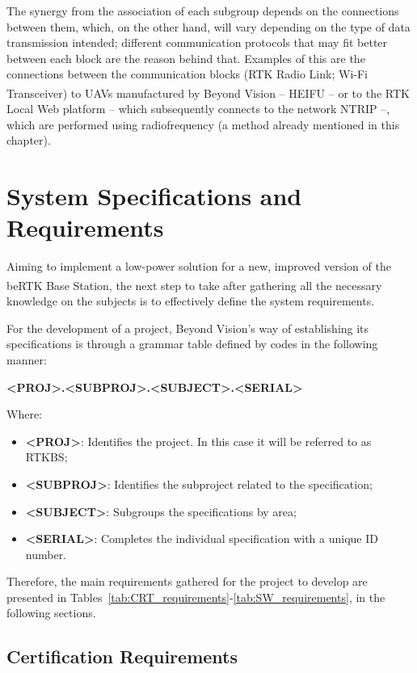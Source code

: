 The synergy from the association of each subgroup depends on the connections between them, which, on the other hand, will vary depending on the type of data transmission intended; different communication protocols that may fit better between each block are the reason behind that. Examples of this are the connections between the communication blocks (RTK Radio Link; Wi-Fi Transceiver) to UAVs manufactured by Beyond Vision -- HEIFU\textsuperscript{\textregistered} -- or to the RTK Local Web platform -- which subsequently connects to the network NTRIP --, which are performed using radiofrequency (a method already mentioned in this chapter).

\section{System Specifications and Requirements}\label{sec:II_Specs}

Aiming to implement a low-power solution for a new, improved version of the beRTK\textsuperscript{\textregistered} Base Station, the next step to take after gathering all the necessary knowledge on the subjects is to effectively define the system requirements.

For the development of a project, Beyond Vision's way of establishing its specifications is through a grammar table defined by codes in the following manner:

\begin{center}
	\textbf{<PROJ>.<SUBPROJ>.<SUBJECT>.<SERIAL>}
\end{center}
Where:
\begin{itemize}
	\item \textbf{<PROJ>}: Identifies the project. In this case it will be referred to as RTKBS;
	\item \textbf{<SUBPROJ>}: Identifies the subproject related to the specification;
	\item \textbf{<SUBJECT>}: Subgroups the specifications by area;
	\item \textbf{<SERIAL>}: Completes the individual specification with a unique ID number.
\end{itemize}

Therefore, the main requirements gathered for the project to develop are presented in Tables~\ref{tab:CRT_requirements}-\ref{tab:SW_requirements}, in the following sections.

\clearpage
\subsection{Certification Requirements}\label{sec:II_CRT_requirements}

